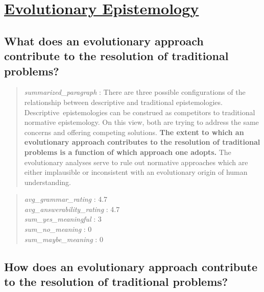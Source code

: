 \hypertarget{evolutionary-epistemology}{%
\section{\texorpdfstring{\href{https://plato.stanford.edu/entries/epistemology-evolutionary/index.html}{Evolutionary
Epistemology}}{Evolutionary Epistemology}}\label{evolutionary-epistemology}}

\hypertarget{what-does-an-evolutionary-approach-contribute-to-the-resolution-of-traditional-problems}{%
\subsection{What does an evolutionary approach contribute to the
resolution of traditional
problems?}\label{what-does-an-evolutionary-approach-contribute-to-the-resolution-of-traditional-problems}}

\begin{quote}
\emph{summarized\_paragraph} : There are three possible configurations
of the relationship between descriptive and traditional epistemologies.
Descriptive~epistemologies can be construed as competitors to
traditional normative epistemology. On this view, both are trying to
address the same concerns and offering competing solutions. \textbf{The
extent to which an evolutionary approach contributes to the resolution
of traditional problems is a function of which approach one adopts.} The
evolutionary analyses serve to rule out normative approaches which are
either implausible or inconsistent with an evolutionary origin of human
understanding.
\end{quote}

\begin{quote}
\emph{avg\_grammar\_rating} : 4.7\\
\emph{avg\_answerability\_rating} : 4.7\\
\emph{sum\_yes\_meaningful} : 3\\
\emph{sum\_no\_meaning} : 0\\
\emph{sum\_maybe\_meaning} : 0
\end{quote}

\hypertarget{how-does-an-evolutionary-approach-contribute-to-the-resolution-of-traditional-problems}{%
\subsection{How does an evolutionary approach contribute to the
resolution of traditional
problems?}\label{how-does-an-evolutionary-approach-contribute-to-the-resolution-of-traditional-problems}}

